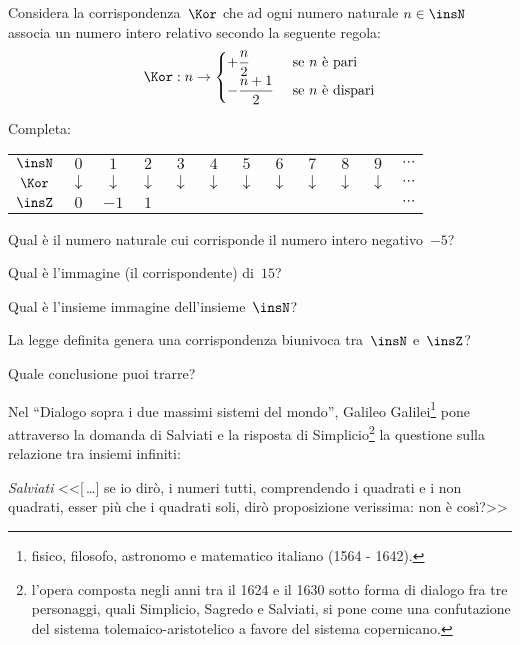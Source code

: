 \begin{exrig}
 \begin{esempio}
Considera la corrispondenza~$\Kor$ che ad ogni numero naturale $n \in \insN$ associa un numero intero relativo secondo la seguente regola:
\[\Kor: n \rightarrow
\begin{cases}
+\dfrac{n}{2} & \text{ se }n \text{ è pari}\\
-\dfrac{n+1}{2} & \text{ se }n \text{ è dispari}
\end{cases}
\]

Completa:
\begin{center}
 \begin{tabular}{cccccccccccc}
  \toprule
  $\insN$ & $0$ & $1$ & $2$ & $3$ & $4$ & $5$ & $6$ & $7$ & $8$ & $9$ & $\cdots$\\
  $\Kor$  & $\downarrow$ & $\downarrow$ & $\downarrow$ & $\downarrow$ & $\downarrow$ & $\downarrow$ & $\downarrow$ & $\downarrow$ & $\downarrow$ &$\downarrow$ & $\cdots$\\
  $\insZ$ & $0$ & $-1$ & $1$ & & & & & & & & $\cdots$\\
  \bottomrule
 \end{tabular}
\end{center}
\begin{itemize*}
\item Qual è il numero naturale cui corrisponde il numero intero negativo~$-5$?
\item Qual è l'immagine (il corrispondente) di~$15$?
\item Qual è l'insieme immagine dell'insieme~$\insN$?
\item La legge definita genera una corrispondenza biunivoca tra~$\insN$ e~$\insZ$?
\item Quale conclusione puoi trarre?
\end{itemize*}
 \end{esempio}

 \begin{esempio}
Nel ``Dialogo sopra i due massimi sistemi del mondo'', Galileo Galilei\footnote{fisico, filosofo, astronomo e matematico italiano (1564 - 1642).} pone attraverso la domanda di Salviati e la risposta di
Simplicio\footnote{l'opera composta negli anni tra il 1624 e il 1630 sotto forma di dialogo fra tre personaggi, quali Simplicio, Sagredo e Salviati, si pone come una confutazione del sistema tolemaico-aristotelico a favore del sistema copernicano.} la questione sulla relazione tra insiemi infiniti:

\emph{Salviati} <<[\,\ldots] se io dirò, i numeri tutti, comprendendo i quadrati e i non quadrati, esser più che i quadrati soli,
dirò proposizione verissima: non è così?>>


\end{esempio}
\end{exrig}
